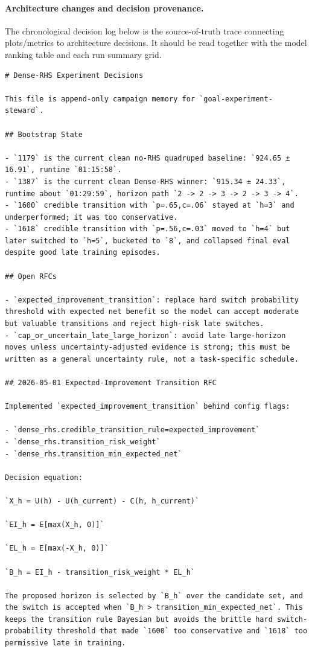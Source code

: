 \paragraph{Architecture changes and decision provenance.}
The chronological decision log below is the source-of-truth trace connecting plots/metrics to architecture decisions. It should be read together with the model ranking table and each run summary grid.

\begin{verbatim}
# Dense-RHS Experiment Decisions

This file is append-only campaign memory for `goal-experiment-steward`.

## Bootstrap State

- `1179` is the current clean no-RHS quadruped baseline: `924.65 ± 16.91`, runtime `01:15:58`.
- `1387` is the current clean Dense-RHS winner: `915.34 ± 24.33`, runtime about `01:29:59`, horizon path `2 -> 2 -> 3 -> 2 -> 3 -> 4`.
- `1600` credible transition with `p=.65,c=.06` stayed at `h=3` and underperformed; it was too conservative.
- `1618` credible transition with `p=.56,c=.03` moved to `h=4` but later switched to `h=5`, bucketed to `8`, and collapsed final eval despite good late training episodes.

## Open RFCs

- `expected_improvement_transition`: replace hard switch probability threshold with expected net benefit so the model can accept moderate but valuable transitions and reject high-risk late switches.
- `cap_or_uncertain_late_large_horizon`: avoid late large-horizon moves unless uncertainty-adjusted evidence is strong; this must be written as a general uncertainty rule, not a task-specific schedule.

## 2026-05-01 Expected-Improvement Transition RFC

Implemented `expected_improvement_transition` behind config flags:

- `dense_rhs.credible_transition_rule=expected_improvement`
- `dense_rhs.transition_risk_weight`
- `dense_rhs.transition_min_expected_net`

Decision equation:

`X_h = U(h) - U(h_current) - C(h, h_current)`

`EI_h = E[max(X_h, 0)]`

`EL_h = E[max(-X_h, 0)]`

`B_h = EI_h - transition_risk_weight * EL_h`

The proposed horizon is selected by `B_h` over the candidate set, and the switch is accepted when `B_h > transition_min_expected_net`. This keeps the transition rule Bayesian but avoids the brittle hard switch-probability threshold that made `1600` too conservative and `1618` too permissive late in training.


\end{verbatim}
